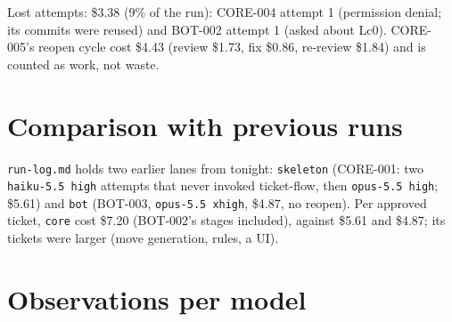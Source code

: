 \documentclass[11pt,a4paper]{article}
\begin{document}
\begin{center}
\end{center}

Lost attempts: \$3.38 (9\% of the run): CORE-004 attempt 1 (permission denial; its commits
were reused) and BOT-002 attempt 1 (asked about Lc0). CORE-005's reopen cycle cost \$4.43
(review \$1.73, fix \$0.86, re-review \$1.84) and is counted as work, not waste.

\section*{Comparison with previous runs}

\texttt{run-log.md} holds two earlier lanes from tonight: \texttt{skeleton} (CORE-001: two
\texttt{haiku-5.5 high} attempts that never invoked ticket-flow, then \texttt{opus-5.5 high};
\$5.61) and \texttt{bot} (BOT-003, \texttt{opus-5.5 xhigh}, \$4.87, no reopen). Per approved
ticket, \texttt{core} cost \$7.20 (BOT-002's stages included), against \$5.61 and \$4.87; its tickets
were larger (move generation, rules, a UI).

\section*{Observations per model}
\end{document}
